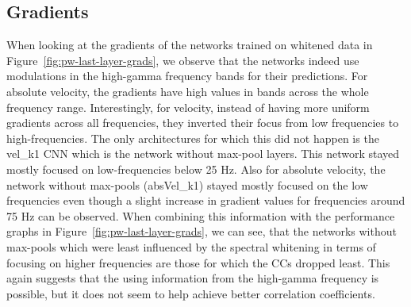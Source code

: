 \subsection{Gradients}\label{subsec:pw-gradients2}

When looking at the gradients of the networks trained on whitened data in Figure~\ref{fig:pw-last-layer-grads}, we observe that the networks indeed use modulations in the high-gamma frequency bands for their predictions.
For absolute velocity, the gradients have high values in bands across the whole frequency range. Interestingly, for velocity, instead of having more uniform gradients across all frequencies, they inverted their focus from low frequencies to high-frequencies.
The only architectures for which this did not happen is the vel\_k1 CNN which is the network without max-pool layers.
This network stayed mostly focused on low-frequencies below 25 Hz.
Also for absolute velocity, the network without max-pools (absVel\_k1) stayed mostly focused on the low frequencies even though a slight increase in gradient values for frequencies around 75 Hz can be observed. 
When combining this information with the performance graphs in Figure~\ref{fig:pw-last-layer-grads}, we can see, that the networks without max-pools which were least influenced by the spectral whitening in terms of focusing on higher frequencies are those for which the CCs dropped least.
This again suggests that the using information from the high-gamma frequency is possible, but it does not seem to help achieve better correlation coefficients.

